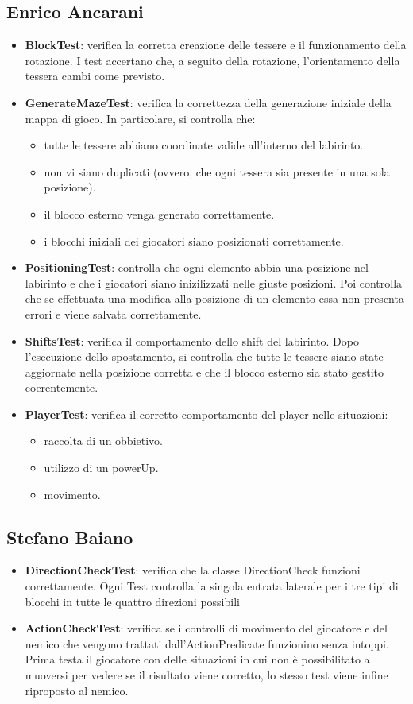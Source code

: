 \documentclass[a4paper,12pt]{report}
\begin{document}
\subsection{Enrico Ancarani}
\begin{itemize}
	\item \textbf{BlockTest}: verifica la corretta creazione delle tessere e il funzionamento della rotazione. I test accertano che, a seguito della rotazione, 
	l’orientamento della tessera cambi come previsto.
	\item \textbf{GenerateMazeTest}: verifica la correttezza della generazione iniziale della mappa di gioco. In particolare, si controlla che:
	\begin{itemize}
		\item tutte le tessere abbiano coordinate valide all’interno del labirinto.
		\item non vi siano duplicati (ovvero, che ogni tessera sia presente in una sola posizione).
		\item il blocco esterno venga generato correttamente.
		\item i blocchi iniziali dei giocatori siano posizionati correttamente.
	\end{itemize}
	\item \textbf{PositioningTest}: controlla che ogni elemento abbia una posizione nel labirinto e che i giocatori siano inizilizzati nelle giuste posizioni.
	Poi controlla che se effettuata una modifica alla posizione di un elemento essa non presenta errori e viene salvata correttamente.
	\item \textbf{ShiftsTest}: verifica il comportamento dello shift del labirinto. Dopo l’esecuzione dello spostamento, si controlla che 
	tutte le tessere siano state aggiornate nella posizione corretta e che il blocco esterno sia stato gestito coerentemente.
	\item \textbf{PlayerTest}: verifica il corretto comportamento del player nelle situazioni:
	\begin{itemize}
		\item raccolta di un obbietivo.
		\item utilizzo di un powerUp.
		\item movimento.
	\end{itemize}
\end{itemize}

\subsection{Stefano Baiano}
\begin{itemize}
	\item \textbf{DirectionCheckTest}: verifica che la classe DirectionCheck funzioni correttamente. Ogni Test controlla la singola 
	entrata laterale per i tre tipi di blocchi in tutte le quattro direzioni possibili
	\item \textbf{ActionCheckTest}: verifica se i controlli di movimento del giocatore e del nemico che vengono trattati dall'ActionPredicate
	funzionino senza intoppi. Prima testa il giocatore con delle situazioni in cui non è possibilitato a muoversi per vedere se il risultato 
	viene corretto, lo stesso test viene infine riproposto al nemico.
\end{itemize}
\end{document}
